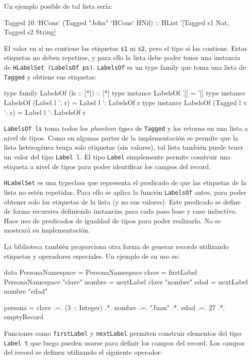 Un ejemplo posible de tal lista sería:

\begin{code}
Tagged 10 `HCons` (Tagged "John" `HCons` HNil) ::
  HList '[Tagged s1 Nat, Tagged s2 String]
\end{code}

El valor en sí no contiene las etiquetas \texttt{s1} ni \texttt{s2}, pero el tipo sí las contiene. Estas etiquetas no deben repetirse, y para ello la lista debe poder tener una instancia de \texttt{HLabelSet (LabelsOf ps)}. \texttt{LabelsOf} es un type family que toma una lista de \texttt{Tagged} y obtiene sus etiquetas:

\begin{code}
type family LabelsOf (ls :: [*]) :: [*]
type instance LabelsOf '[] = '[]
type instance LabelsOf (Label l ': r) = Label l ': LabelsOf r
type instance LabelsOf (Tagged l v ': r) = Label l ': LabelsOf r
\end{code}

\texttt{LabelsOf ls} toma todos los \textit{phantom types} de \texttt{Tagged} y los retorna en una lista a nivel de tipos. Como en algunas partes de la implementación se permite que la lista heterogénea tenga solo etiquetas (sin valores), tal lista también puede tener un valor del tipo \texttt{Label l}. El tipo \texttt{Label} simplemente permite cosntruir una etiqueta a nivel de tipos para poder identificar los campos del record.

\texttt{HLabelSet} es una typeclass que representa el predicado de que las etiquetas de la lista no estén repetidas. Para ello se aplica la función \texttt{LabelsOf} antes, para poder obtener solo las etiquetas de la lista (y no sus valores). Este predicado se define de forma recursiva definiendo instancias para cada paso base y caso inductivo. Hace uso de predicados de igualdad de tipos para poder realizarlo. No se mostrará su implementación.

La biblioteca también proporciona otra forma de generar records utilizando etiquetas y operadores especiales. Un ejemplo de su uso es:

\begin{code}
data PersonaNamespace = PersonaNamespace
clave = firstLabel PersonaNamespace "clave"
nombre = nextLabel clave "nombre"
edad = nextLabel nombre "edad"

persona = clave .=. (3 :: Integer)
  .*. nombre .=. "Juan"
  .*. edad .=. 27
  .*. emptyRecord
\end{code}

Funciones como \texttt{firstLabel} y \texttt{nextLabel} permiten construir elementos del tipo \texttt{Label t} que luego pueden usarse para definir los campos del record. Los campos del record se definen utilizando el siguiente operador:

